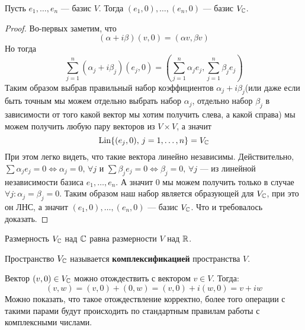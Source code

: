 \documentclass[../main.tex]{subfiles}
\begin{document}
\begin{theorem-non}
\label{non:8.8}
  Пусть $e_1, \dotsc, e_n$ --- базис $V$. Тогда $(e_1, 0), \dotsc, (e_n, 0)$ --- базис $V_{\mathbb{C}}$.
\end{theorem-non}
\begin{proof}
  Во-первых заметим, что
  \begin{equation*}
    (\alpha + i \beta)(v, 0) = (\alpha v, \beta v)
  \end{equation*}
  Но тогда
  \begin{equation*}
    \sum\limits_{j = 1}^{n} (\alpha_j + i \beta_j)(e_j, 0)
    =
    \left(\sum\limits_{j = 1}^{n} \alpha_j e_j, \sum\limits_{j = 1}^{n} \beta_j e_j\right)
  \end{equation*}
  Таким образом выбрав правильный набор коэффициентов $\alpha_j + i \beta_j$(или даже если быть точным мы можем отдельно выбрать набор $\alpha_j$, отдельно набор $\beta_j$ в зависимости от того какой вектор мы хотим получить слева, а какой справа) мы можем получить любую пару векторов из $V \times V$, а значит
  \begin{equation*}
    \operatorname{Lin} \{ (e_j, 0), \, j = 1,\dotsc,n \} = V_{\mathbb{C}}
  \end{equation*}
  При этом легко видеть, что такие вектора линейно независимы. Действительно, $\sum \alpha_j e_j = 0 \iff \alpha_j = 0,\, \forall j$ и $\sum \beta_j e_j = 0 \iff \beta_j = 0,\, \forall j$ --- из линейной независимости базиса $e_1, \dotsc, e_n$. А значит 0 мы можем получить только в случае $\forall j\colon \alpha_j = \beta_j = 0$. Таким образом наш набор является образующей для $V_{\mathbb{C}}$, при это он ЛНС, а значит $(e_1, 0), \dotsc, (e_n, 0)$ --- базис $V_{\mathbb{C}}$. Что и требовалось доказать.
\end{proof}

\begin{corollary*}
  Размерность $V_{\mathbb{C}}$ над $\mathbb{C}$ равна размерности $V$ над $\mathbb{R}$.
\end{corollary*}

\begin{definition}
  Пространство $V_{\mathbb{C}}$ называется \textbf{комплексификацией} пространства $V$.
\end{definition}

\begin{remark}
  Вектор $(v, 0) \in V_{\mathbb{C}}$ можно отождествить с вектором $v \in V$. Тогда:
  \begin{equation*}
    (v, w) = (v, 0) + (0, w) = (v, 0) + i(w, 0) = v + iw
  \end{equation*}
  Можно показать, что такое отождествление корректно, более того операции с такими парами будут происходить по стандартным правилам работы с комплексными числами.
\end{remark}
\end{document}
